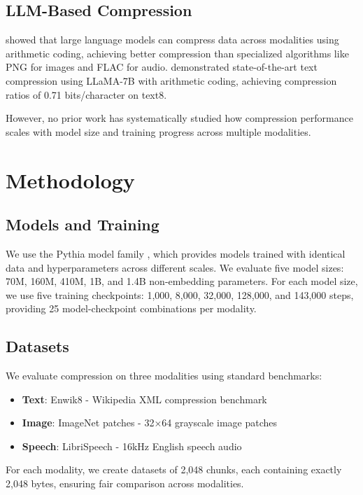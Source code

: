 \documentclass[11pt]{article}
\begin{document}
\subsection{LLM-Based Compression}

\citet{deletang2023compression} showed that large language models can compress data across modalities using arithmetic coding, achieving better compression than specialized algorithms like PNG for images and FLAC for audio. \citet{kaushik2023llmzip} demonstrated state-of-the-art text compression using LLaMA-7B with arithmetic coding, achieving compression ratios of 0.71 bits/character on text8.

However, no prior work has systematically studied how compression performance scales with model size and training progress across multiple modalities.

\section{Methodology}

\subsection{Models and Training}

We use the Pythia model family \citep{biderman2023pythia}, which provides models trained with identical data and hyperparameters across different scales. We evaluate five model sizes: 70M, 160M, 410M, 1B, and 1.4B non-embedding parameters. For each model size, we use five training checkpoints: 1,000, 8,000, 32,000, 128,000, and 143,000 steps, providing 25 model-checkpoint combinations per modality.

\subsection{Datasets}

We evaluate compression on three modalities using standard benchmarks:
\begin{itemize}
\item \textbf{Text}: Enwik8 - Wikipedia XML compression benchmark
\item \textbf{Image}: ImageNet patches - 32×64 grayscale image patches  
\item \textbf{Speech}: LibriSpeech - 16kHz English speech audio
\end{itemize}

For each modality, we create datasets of 2,048 chunks, each containing exactly 2,048 bytes, ensuring fair comparison across modalities.
\end{document}
